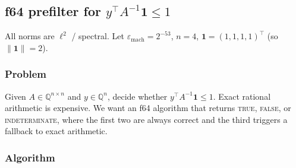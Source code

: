 %
%
%
\providecommand{\one}{\mathbf{1}}
\providecommand{\emach}{\varepsilon_{\mathrm{mach}}}

\subsection{f64 prefilter for $y^\top A^{-1}\one \le 1$}

All norms are $\ell^2$ / spectral.
Let $\emach = 2^{-53}$, $n = 4$, $\one = (1,1,1,1)^\top$
(so $\|\one\| = 2$).

\subsubsection*{Problem}

Given $A \in \mathbb{Q}^{n \times n}$ and $y \in \mathbb{Q}^n$,
decide whether $y^\top A^{-1}\one \le 1$.
Exact rational arithmetic is expensive.
We want an f64 algorithm that returns
\textsc{true}, \textsc{false}, or \textsc{indeterminate},
where the first two are always correct and the third
triggers a fallback to exact arithmetic.

\subsubsection*{Algorithm}

